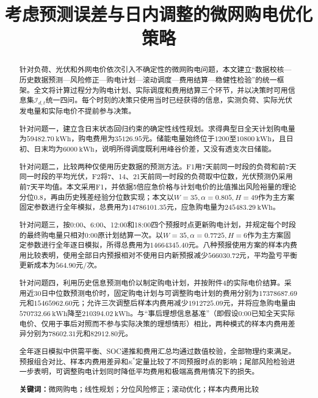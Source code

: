 \documentclass[UTF8,12pt,a4paper]{ctexart}
\title{考虑预测误差与日内调整的微网购电优化策略}
\author{}\date{}
\newcommand{\keywords}[1]{\par\noindent\textbf{关键词：}#1}
\theoremstyle{remark}
\begin{document}
\maketitle

\begin{abstract}
针对负荷、光伏和外网电价依次引入不确定性的微网购电问题，本文建立“数据校核—历史数据预测—风险修正—购电计划—滚动调度—费用结算—稳健性检验”的统一框架。全文将计算过程分为购电计划、实际调度和费用结算三个环节，并以决策时可用信息集$\mathcal I_{d,t}$统一四问。每个时刻的决策只使用当时已经获得的信息，实测负荷、实际光伏发电量和实际电价不提前参与决策。

针对问题一，建立含日末状态回归约束的确定性线性规划。求得典型日全天计划购电量为$59482.70\ \mathrm{kWh}$，购电费用为$35126.95$元。储能电量始终位于$1200$至$10800\ \mathrm{kWh}$，且日初、日末均为$6000\ \mathrm{kWh}$，说明所得调度既利用峰谷价差，又没有透支次日储能。

针对问题二，比较两种仅使用历史数据的预测方法。F1用7天前同一时段的负荷和前7天同一时段的平均光伏，F2将7、14、21天前同一时段的负荷取中位数，光伏预测仍采用前7天平均值。本文采用F1，并依据5倍应急价格与计划电价的比值推出风险裕量的理论分位$0.8$，再由历史残差经验分位数实现；本文以$W=35,\alpha=0.805,H=49$作为主方案固定参数进行全年模拟，总费用为$14786101.35$元，应急购电量为$245483.29\ \mathrm{kWh}$。

针对问题三，按0:00、6:00、12:00和18:00四个预报时点更新购电计划，并规定每个时段的最终购电量只相对0:00原计划结算一次。以$W=35,\alpha=0.7725,H=6$作为主方案固定参数进行全年逐日模拟，所得总费用为$14664345.40$元。八种预报使用方案的样本内费用比较表明，使用全部日内预报相对不使用日内新预报减少$566030.72$元，平均盈亏平衡更新成本为$564.90$元/次。

针对问题四，利用历史信息预测电价以制定购电计划，并按附件4的实际电价结算。采用近30日中位数预测电价时，固定购电计划与可调整购电计划的费用分别为$17378687.69$元和$15465962.60$元；允许三次调整后样本内费用减少$1912725.09$元，并将应急购电量由$570732.66\ \mathrm{kWh}$降至$210394.02\ \mathrm{kWh}$。与“事后理想信息基准”（即假设0:00已知全天实际电价、仅用于事后对照而不参与实际决策的理想情形）相比，两种模式的样本内费用差异分别为$78602.31$元和$82912.80$元。

全年逐日模拟中供需平衡、SOC递推和费用汇总均通过数值校验，全部物理约束满足。预报组合对比、样本内费用差异和$\kappa^*$定量比较了不同预报时点的影响；尾部风险检验进一步表明，可调整购电计划同时降低平均费用和极端高费用情况下的损失。
\keywords{微网购电；线性规划；分位风险修正；滚动优化；样本内费用比较}
\end{abstract}
\clearpage
\end{document}

